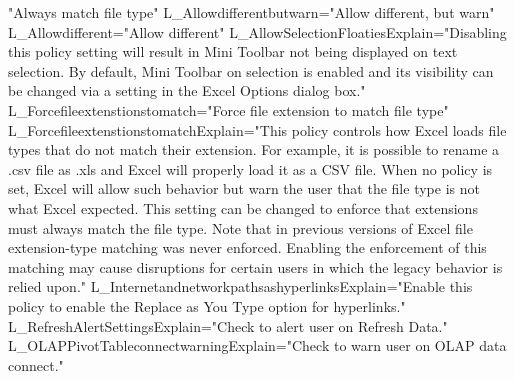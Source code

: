" A l w a y s   m a t c h   f i l e   t y p e " 
 
 L _ A l l o w d i f f e r e n t b u t w a r n = " A l l o w   d i f f e r e n t ,   b u t   w a r n " 
 
 L _ A l l o w d i f f e r e n t = " A l l o w   d i f f e r e n t " 
 
 L _ A l l o w S e l e c t i o n F l o a t i e s E x p l a i n = " D i s a b l i n g   t h i s   p o l i c y   s e t t i n g   w i l l   r e s u l t   i n   M i n i   T o o l b a r   n o t   b e i n g   d i s p l a y e d   o n   t e x t   s e l e c t i o n .   B y   d e f a u l t ,   M i n i   T o o l b a r   o n   s e l e c t i o n   i s   e n a b l e d   a n d   i t s   v i s i b i l i t y   c a n   b e   c h a n g e d   v i a   a   s e t t i n g   i n   t h e   E x c e l   O p t i o n s   d i a l o g   b o x . " 
 
 L _ F o r c e f i l e e x t e n s t i o n s t o m a t c h = " F o r c e   f i l e   e x t e n s i o n   t o   m a t c h   f i l e   t y p e " 
 
 L _ F o r c e f i l e e x t e n s t i o n s t o m a t c h E x p l a i n = " T h i s   p o l i c y   c o n t r o l s   h o w   E x c e l   l o a d s   f i l e   t y p e s   t h a t   d o   n o t   m a t c h   t h e i r   e x t e n s i o n .   F o r   e x a m p l e ,   i t   i s   p o s s i b l e   t o   r e n a m e   a   . c s v   f i l e   a s   . x l s   a n d   E x c e l   w i l l   p r o p e r l y   l o a d   i t   a s   a   C S V   f i l e .   W h e n   n o   p o l i c y   i s   s e t ,   E x c e l   w i l l   a l l o w   s u c h   b e h a v i o r   b u t   w a r n   t h e   u s e r   t h a t   t h e   f i l e   t y p e   i s   n o t   w h a t   E x c e l   e x p e c t e d .   T h i s   s e t t i n g   c a n   b e   c h a n g e d   t o   e n f o r c e   t h a t   e x t e n s i o n s   m u s t   a l w a y s   m a t c h   t h e   f i l e   t y p e .   N o t e   t h a t   i n   p r e v i o u s   v e r s i o n s   o f   E x c e l   f i l e   e x t e n s i o n - t y p e   m a t c h i n g   w a s   n e v e r   e n f o r c e d .   E n a b l i n g   t h e   e n f o r c e m e n t   o f   t h i s   m a t c h i n g   m a y   c a u s e   d i s r u p t i o n s   f o r   c e r t a i n   u s e r s   i n   w h i c h   t h e   l e g a c y   b e h a v i o r   i s   r e l i e d   u p o n . " 
 
 L _ I n t e r n e t a n d n e t w o r k p a t h s a s h y p e r l i n k s E x p l a i n = " E n a b l e   t h i s   p o l i c y   t o   e n a b l e   t h e   R e p l a c e   a s   Y o u   T y p e   o p t i o n   f o r   h y p e r l i n k s . " 
 
 L _ R e f r e s h A l e r t S e t t i n g s E x p l a i n = " C h e c k   t o   a l e r t   u s e r   o n   R e f r e s h   D a t a . " 
 
 L _ O L A P P i v o t T a b l e c o n n e c t w a r n i n g E x p l a i n = " C h e c k   t o   w a r n   u s e r   o n   O L A P   d a t a   c o n n e c t . " 
